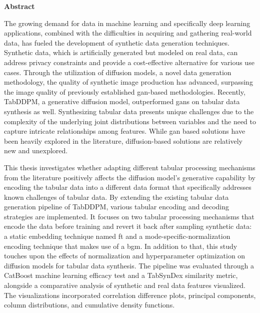 \thispagestyle{empty}
\begin{center}
	\textbf{\LARGE Abstract}
\end{center}
The growing demand for data in machine learning and specifically deep learning applications, combined with the difficulties in acquiring and gathering real-world data, has fueled the development of synthetic data generation techniques.
Synthetic data, which is artificially generated but modeled on real data, can address privacy constraints and provide a cost-effective alternative for various use cases.
Through the utilization of diffusion models, a novel data generation methodology, the quality of synthetic image production has advanced, surpassing the image quality of previously established \gls{gan}-based methodologies.
Recently, TabDDPM, a generative diffusion \gls{model}, outperformed \glspl{gan} on tabular data synthesis as well.
Synthesizing tabular data presents unique challenges due to the complexity of the underlying joint distributions between variables and the need to capture intricate relationships among features.
While \gls{gan} based solutions have been heavily explored in the literature, diffusion-based solutions are relatively new and unexplored.


This thesis investigates whether adapting different tabular processing mechanisms from the literature positively affects the diffusion \gls{model}'s generative capability by encoding the tabular data into a different data format that specifically addresses known challenges of tabular data.
By extending the existing tabular data generation pipeline of TabDDPM, various tabular encoding and decoding strategies are implemented.
It focuses on two tabular processing mechanisms that encode the data before training and revert it back after sampling synthetic data: a static embedding technique named \gls{ft} and a mode-specific-normalization encoding technique that makes use of a \gls{bgm}.
In addition to that, this study touches upon the effects of normalization and hyperparameter optimization on diffusion models for tabular data synthesis.
The pipeline was evaluated through a CatBoost machine learning efficacy test and a TabSynDex similarity metric, alongside a comparative analysis of synthetic and real data features visualized. 
The visualizations incorporated correlation difference plots, principal components, column distributions, and cumulative density functions.



